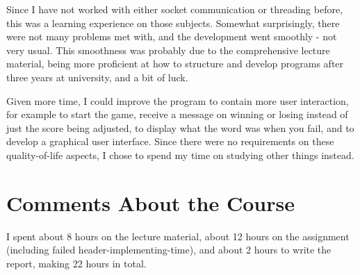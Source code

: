 \documentclass[a4paper]{scrartcl}
\begin{document}
Since I have not worked with either socket communication or threading before, this was a learning experience on those subjects. Somewhat surprisingly, there were not many problems met with, and the development went smoothly - not very usual. This smoothness was probably due to the comprehensive lecture material, being more proficient at how to structure and develop programs after three years at university, and a bit of luck.

Given more time, I could improve the program to contain more user interaction, for example to start the game, receive a message on winning or losing instead of just the score being adjusted, to display what the word was when you fail, and to develop a graphical user interface. Since there were no requirements on these quality-of-life aspects, I chose to spend my time on studying other things instead.

\section{Comments About the Course}

I spent about 8 hours on the lecture material, about 12 hours on the assignment (including failed header-implementing-time), and about 2 hours to write the report, making 22 hours in total.
\end{document}
